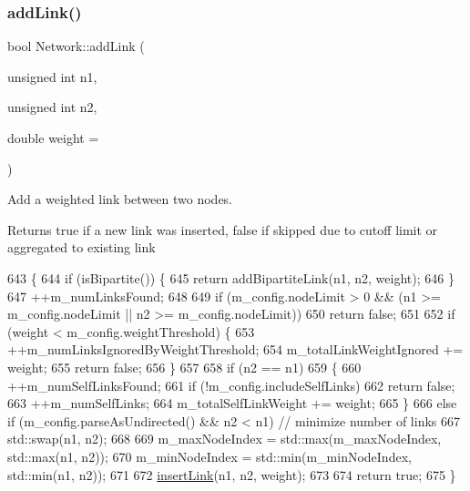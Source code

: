 \subsubsection{\texorpdfstring{add\+Link()}{addLink()}}
{\footnotesize\ttfamily bool Network\+::add\+Link (\begin{DoxyParamCaption}\item[{unsigned int}]{n1,  }\item[{unsigned int}]{n2,  }\item[{double}]{weight = {} }\end{DoxyParamCaption})}

Add a weighted link between two nodes. \begin{DoxyReturn}{Returns}
true if a new link was inserted, false if skipped due to cutoff limit or aggregated to existing link 
\end{DoxyReturn}

\begin{DoxyCode}
643 \{
644     \textcolor{keywordflow}{if} (isBipartite()) \{
645         \textcolor{keywordflow}{return} addBipartiteLink(n1, n2, weight);
646     \}
647     ++m\_numLinksFound;
648 
649     \textcolor{keywordflow}{if} (m\_config.nodeLimit > 0 && (n1 >= m\_config.nodeLimit || n2 >= m\_config.nodeLimit))
650         \textcolor{keywordflow}{return} \textcolor{keyword}{false};
651     
652     \textcolor{keywordflow}{if} (weight < m\_config.weightThreshold) \{
653         ++m\_numLinksIgnoredByWeightThreshold;
654         m\_totalLinkWeightIgnored += weight;
655         \textcolor{keywordflow}{return} \textcolor{keyword}{false};
656     \}
657 
658     \textcolor{keywordflow}{if} (n2 == n1)
659     \{
660         ++m\_numSelfLinksFound;
661         \textcolor{keywordflow}{if} (!m\_config.includeSelfLinks)
662             \textcolor{keywordflow}{return} \textcolor{keyword}{false};
663         ++m\_numSelfLinks;
664         m\_totalSelfLinkWeight += weight;
665     \}
666     \textcolor{keywordflow}{else} \textcolor{keywordflow}{if} (m\_config.parseAsUndirected() && n2 < n1) \textcolor{comment}{// minimize number of links}
667         std::swap(n1, n2);
668 
669     m\_maxNodeIndex = std::max(m\_maxNodeIndex, std::max(n1, n2));
670     m\_minNodeIndex = std::min(m\_minNodeIndex, std::min(n1, n2));
671 
672     \mbox{\hyperlink{classNetwork_ace5fa3249715ed1b840fa733976aa57b}{insertLink}}(n1, n2, weight);
673 
674     \textcolor{keywordflow}{return} \textcolor{keyword}{true};
675 \}
\end{DoxyCode}
\mbox{\label{classNetwork_ac2e5a12947f9983b6193d593ec329a5f}} 
